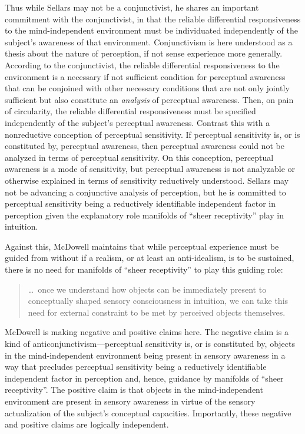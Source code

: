 \documentclass[12pt]{article}
\begin{document}
Thus while Sellars may not be a conjunctivist, he shares an important commitment with the conjunctivist, in that the reliable differential responsiveness to the mind-independent environment must be individuated independently of the subject's awareness of that environment. Conjunctivism is here understood as a thesis about the nature of perception, if not sense experience more generally. According to the conjunctivist, the reliable differential responsiveness to the environment is a necessary if not sufficient condition for perceptual awareness that can be conjoined with other necessary conditions that are not only jointly sufficient but also constitute an \emph{analysis} of perceptual awareness. Then, on pain of circularity, the reliable differential responsiveness must be specified independently of the subject's perceptual awareness. Contrast this with a nonreductive conception of perceptual sensitivity. If perceptual sensitivity is, or is constituted by, perceptual awareness, then perceptual awareness could not be analyzed in terms of perceptual sensitivity. On this conception, perceptual awareness is a mode of sensitivity, but perceptual awareness is not analyzable or otherwise explained in terms of sensitivity reductively understood. Sellars may not be advancing a conjunctive analysis of perception, but he is committed to perceptual sensitivity being a reductively identifiable independent factor in perception given the explanatory role manifolds of ``sheer receptivity'' play in intuition. 

Against this, McDowell maintains that while perceptual experience must be guided from without if a realism, or at least an anti-idealism, is to be sustained, there is no need for manifolds of ``sheer receptivity'' to play this guiding role:
\begin{quote}
    \ldots\ once we understand how objects can be immediately present to conceptually shaped sensory consciousness in intuition, we can take this need for external constraint to be met by perceived objects themselves. \citep[46]{McDowell:1998vn}
\end{quote}
McDowell is making negative and positive claims here. The negative claim is a kind of anticonjunctivism---perceptual sensitivity is, or is constituted by, objects in the mind-independent environment being present in sensory awareness in a way that precludes perceptual sensitivity being a reductively identifiable independent factor in perception and, hence, guidance by manifolds of ``sheer receptivity''. The positive claim is that objects in the mind-independent environment are present in sensory awareness in virtue of the sensory actualization of the subject's conceptual capacities. Importantly, these negative and positive claims are logically independent.
\end{document}
